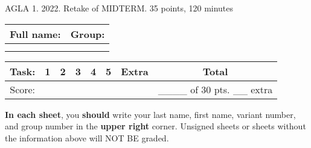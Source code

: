 \documentclass[]{exam}
\begin{document}
\centering 

AGLA 1. 2022. Retake of MIDTERM. 35 points, 120 minutes
\bigskip

  \begin{tabular}[b]{|p{11cm}|c|}
  \hline
  Full name: & Group: \\ \hline
   &  \\ 
   & \\
   \hline
  \end{tabular}
\bigskip

\begin{tabular}[b]{|c|c|c|c|c|c|c|c|}
    \hline
    Task: & 1 & 2 & 3 & 4 & 5 & Extra & Total \\ \hline
    Score: &  &  &  &  &  & & \_\_\_\_ of 30 pts. \_\_  extra \\ \hline
\end{tabular}

\begin{flushleft}
    \textbf{In each sheet}, you \textbf{should} write your last name, first name, variant number, and group number in the \textbf{upper right} corner. Unsigned sheets or sheets without the information above will NOT BE graded.
\end{flushleft}
\end{document}
